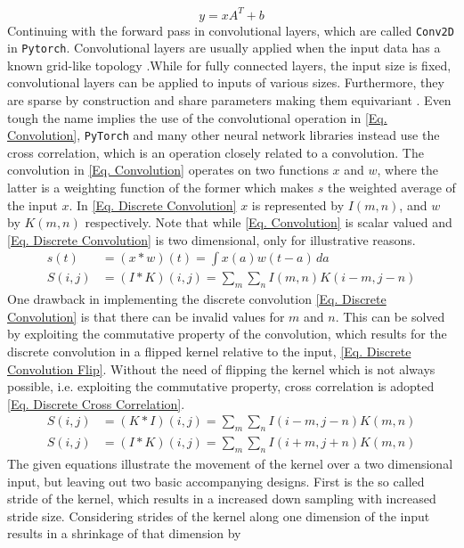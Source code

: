 \documentclass[12pt, a4paper]{article}
\begin{document}
\begin{equation}
	y = xA^T + b \label{Eq. Linear Transformation}
\end{equation}
Continuing with the forward pass in convolutional layers, which are called \texttt{Conv2D}\cite{bibid} in \texttt{Pytorch}. Convolutional layers are usually applied when the input data has a known grid-like topology \cite{Goodfellow}.While for fully connected layers, the input size is fixed, convolutional layers can be applied to inputs of various sizes. Furthermore, they are sparse by construction and share parameters making them equivariant \cite{Goodfellow}.  Even tough the name implies the use of the convolutional operation in \cref{Eq. Convolution}, \texttt{PyTorch} and many other neural network libraries instead use the cross correlation, which is an operation closely related to a convolution\cite{Goodfellow}\cite{Pytorch website}. The convolution in \ref{Eq. Convolution} operates on two functions \(x\) and \(w\), where the latter is a weighting function of the former which makes \(s\) the weighted average of the input \(x\). In \cref{Eq. Discrete Convolution} \(x\) is represented by \(I(m,n)\), and \(w\) by \(K(m,n)\) respectively. Note that while \cref{Eq. Convolution} is scalar valued and \cref{Eq. Discrete Convolution} is two dimensional, only for illustrative reasons. 
\begin{align}
	s(t) &= (x * w)(t) = \int x(a)w(t-a)\,da \label{Eq. Convolution}\\
	S(i,j) &= (I * K)(i,j) = \sum_{m}\sum_{n}I(m,n)K(i-m,j-n)
	\label{Eq. Discrete Convolution}
\end{align}
One drawback in implementing the discrete convolution \cref{Eq. Discrete Convolution} is that there can be invalid values for \(m\) and \(n\). This can be solved by exploiting the commutative property of the convolution, which results for the discrete convolution in a flipped kernel relative to the input, \cref{Eq. Discrete Convolution Flip}. Without the need of flipping the kernel which is not always possible, i.e. exploiting the commutative property, cross correlation is adopted \cref{Eq. Discrete Cross Correlation}.
\begin{align}
	S(i,j) &= (K * I)(i,j) = \sum_{m}\sum_{n}I(i-m,j-n)K(m,n) 
	\label{Eq. Discrete Convolution Flip}\\
	S(i,j) &= (I * K)(i,j) = \sum_{m}\sum_{n}I(i+m,j+n)K(m,n) 
	\label{Eq. Discrete Cross Correlation}
\end{align}
The given equations illustrate the movement of the kernel over a two dimensional input, but leaving out two basic accompanying designs. First is the so called stride of the kernel, which results in a increased down sampling with increased stride size. Considering strides of the kernel along one dimension of the input results in a shrinkage of that dimension by 
\end{document}
